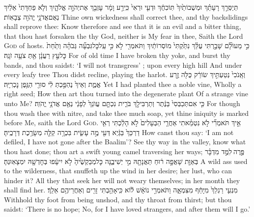 {תְּיַסְּרֵ֣ךְ רָעָתֵ֗ךְ וּמְשֻׁבוֹתַ֙יִךְ֙ תּֽוֹכִחֻ֔ךְ וּדְעִ֤י וּרְאִי֙ כִּֽי\maqqaf רַ֣ע וָמָ֔ר עׇזְבֵ֖ךְ אֶת\maqqaf יְהֹוָ֣ה אֱלֹהָ֑יִךְ וְלֹ֤א פַחְדָּתִי֙ אֵלַ֔יִךְ נְאֻם\maqqaf אֲדֹנָ֥י יֱהֹוִ֖ה צְבָאֽוֹת׃}
{Thine own wickedness shall correct thee, and thy backslidings shall reprove thee: Know therefore and see that it is an evil and a bitter thing, that thou hast forsaken the \lord\space thy God, neither is My fear in thee, Saith the Lord \textsc{God} of hosts.}
{כִּ֣י מֵעוֹלָ֞ם שָׁבַ֣רְתִּי עֻלֵּ֗ךְ נִתַּ֙קְתִּי֙ מוֹסְרוֹתַ֔יִךְ וַתֹּאמְרִ֖י לֹ֣א  כִּ֣י עַֽל\maqqaf כׇּל\maqqaf גִּבְעָ֞ה גְּבֹהָ֗ה וְתַ֙חַת֙ כׇּל\maqqaf עֵ֣ץ רַעֲנָ֔ן אַ֖תְּ צֹעָ֥ה זֹנָֽה׃}
{For of old time I have broken thy yoke, and burst thy bands, and thou saidst: ‘I will not transgress’ ; upon every high hill And under every leafy tree Thou didst recline, playing the harlot.}
{וְאָֽנֹכִי֙ נְטַעְתִּ֣יךְ שׂוֹרֵ֔ק כֻּלֹּ֖ה זֶ֣רַע אֱמֶ֑ת וְאֵיךְ֙ נֶהְפַּ֣כְתְּ לִ֔י סוּרֵ֖י הַגֶּ֥פֶן נׇכְרִיָּֽה׃}
{Yet I had planted thee a noble vine, Wholly a right seed; How then art thou turned into the degenerate plant Of a strange vine unto Me?}
{כִּ֤י אִם\maqqaf תְּכַבְּסִי֙ בַּנֶּ֔תֶר וְתַרְבִּי\maqqaf לָ֖ךְ בֹּרִ֑ית נִכְתָּ֤ם עֲוֺנֵךְ֙ לְפָנַ֔י נְאֻ֖ם אֲדֹנָ֥י יֱהֹוִֽה׃}
{For though thou wash thee with nitre, and take thee much soap, yet thine iniquity is marked before Me, saith the Lord \textsc{God}.}
{אֵ֣יךְ תֹּאמְרִ֞י לֹ֣א נִטְמֵ֗אתִי אַחֲרֵ֤י הַבְּעָלִים֙ לֹ֣א הָלַ֔כְתִּי רְאִ֤י דַרְכֵּךְ֙ בַּגַּ֔יְא דְּעִ֖י מֶ֣ה עָשִׂ֑ית בִּכְרָ֥ה קַלָּ֖ה מְשָׂרֶ֥כֶת דְּרָכֶֽיהָ׃}
{How canst thou say: ‘I am not defiled, I have not gone after the Baalim’? See thy way in the valley, know what thou hast done; thou art a swift young camel traversing her ways;}
{פֶּ֣רֶה \legarmeh  לִמֻּ֣ד מִדְבָּ֗ר בְּאַוַּ֤ת  שָׁאֲפָ֣ה ר֔וּחַ תַּאֲנָתָ֖הּ מִ֣י יְשִׁיבֶ֑נָּה כׇּל\maqqaf מְבַקְשֶׁ֙יהָ֙ לֹ֣א יִיעָ֔פוּ בְּחׇדְשָׁ֖הּ יִמְצָאֽוּנְהָ׃}
{A wild ass used to the wilderness, that snuffeth up the wind in her desire; her lust, who can hinder it? All they that seek her will not weary themselves; in her month they shall find her.}
{מִנְעִ֤י רַגְלֵךְ֙ מִיָּחֵ֔ף  מִצִּמְאָ֑ה וַתֹּאמְרִ֣י נוֹאָ֔שׁ ל֕וֹא כִּֽי\maqqaf אָהַ֥בְתִּי זָרִ֖ים וְאַחֲרֵיהֶ֥ם אֵלֵֽךְ׃}
{Withhold thy foot from being unshod, and thy throat from thirst; but thou saidst: ‘There is no hope; No, for I have loved strangers, and after them will I go.’}
